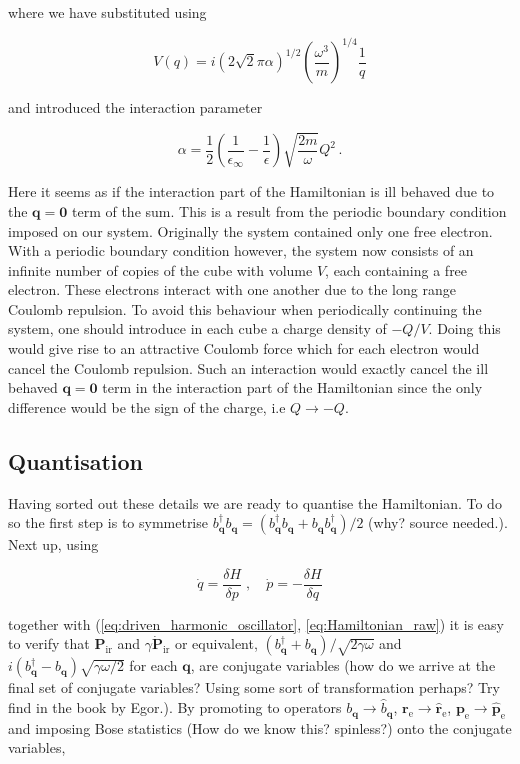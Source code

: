 \documentclass[12pt]{report}
\renewcommand{\vec}[1]{\boldsymbol{\mathbf{#1}}}                        %
\newcommand{\question}[1]{{\leavevmode\color{question}#1}}
\begin{document}
where we have substituted using

\begin{equation}
	\label{eq:VofQ}
	V(q) = i \left( 2 \sqrt 2 \pi \alpha \right)^{1/2} \left( \frac{\omega^3}{m} \right)^{1/4} \frac{1}{q}
\end{equation}

and introduced the interaction parameter

\begin{equation}
	\alpha = \frac{1}{2} \left( \frac{1}{\epsilon_\infty} - \frac{1}{\epsilon} \right) \sqrt{ \frac{2m}{\omega} } Q^2 \,.
\end{equation}

Here it seems as if the interaction part of the Hamiltonian is ill behaved due to the $ \vec q = \vec 0 $ term of the sum. This is a result from the periodic boundary condition imposed on our system. Originally the system contained only one free electron. With a periodic boundary condition however, the system now consists of an infinite number of copies of the cube with volume $ V $, each containing a free electron. These electrons interact with one another due to the long range Coulomb repulsion. To avoid this behaviour when periodically continuing the system, one should introduce in each cube a charge density of $ - Q/V $. Doing this would give rise to an attractive Coulomb force which for each electron would cancel the Coulomb repulsion. Such an interaction would exactly cancel the ill behaved $ \vec q = \vec 0 $ term in the interaction part of the Hamiltonian since the only difference would be the sign of the charge, i.e $ Q \rightarrow -Q $.

\subsection{Quantisation}

Having sorted out these details we are ready to quantise the Hamiltonian. To do so the first step is to symmetrise $ b^\dagger_{\vec q} b_{\vec q} = (b^\dagger_{\vec q} b_{\vec q} + b_{\vec q} b^\dagger_{\vec q})/2 $ \question{(why? source needed.)}. Next up, using\cite{superfluidStatesOfMatter}

\begin{equation}
	\dot q = \frac{\delta H}{\delta p}
	\; , \quad
	\dot p = - \frac{\delta H}{\delta q}
\end{equation}

together with (\ref{eq:driven_harmonic_oscillator}, \ref{eq:Hamiltonian_raw}) it is easy to verify that $ \vec P_\text{ir} $ and $ \gamma \dot{ \vec P}_\text{ir} $ or equivalent, $ (b^\dagger_{\vec q} + b_{\vec q})/\sqrt{2 \gamma \omega} $ and $ i (b^\dagger_{\vec q} - b_{\vec q}) \sqrt{\gamma \omega / 2} $ for each $ \vec q $, are conjugate variables \question{(how do we arrive at the final set of conjugate variables? Using some sort of transformation perhaps? Try find in the book by Egor.)}.  By promoting to operators $ b_{\vec q} \rightarrow \hat b_{\vec q} $, $ \vec r_\text{e} \rightarrow \hat{\vec r}_\text{e} $, $ \vec p_\text{e} \rightarrow \hat{\vec p}_\text{e} $ and imposing Bose statistics \question{(How do we know this? spinless?)} onto the conjugate variables,
\end{document}
